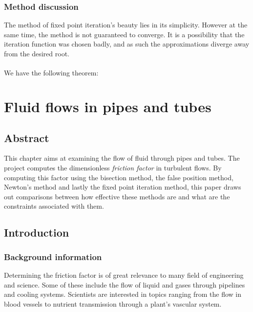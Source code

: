 \documentclass[openany]{book}
\begin{document}
    \subsection{Method discussion}
    The method of fixed point iteration's beauty lies in its simplicity. However at the same time, the method is not guaranteed to converge. It is a possibility that the iteration function was chosen badly, and as such the approximations diverge away from the desired root.\\\\
    We have the following theorem: \\
    \noindent{}
	\chapter{Fluid flows in pipes and tubes}
	\section{Abstract}
	This chapter aims at examining the flow of fluid through pipes and tubes. The project computes the dimensionless \textit{friction factor} in turbulent flows. By computing this factor using the bisection method, the false position method, Newton's method and lastly the fixed point iteration method, this paper draws out comparisons between how effective these methods are and what are the constraints associated with them.
	
	\section{Introduction}
	
	\subsection{Background information}
	Determining the friction factor is of great relevance to many field of engineering and science. Some of these include the flow of liquid and gases through pipelines and cooling systems. Scientists are interested in topics ranging from the flow in blood vessels to nutrient transmission through a plant's vascular system.
	
\end{document}
